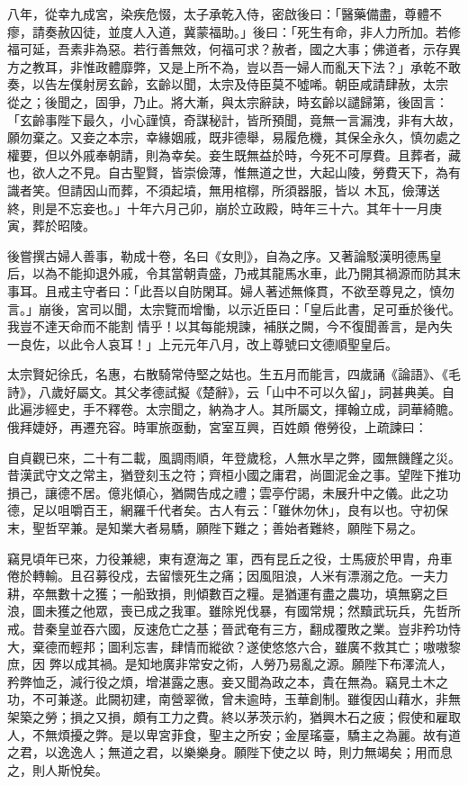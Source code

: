 \begin{pinyinscope}
 八年，從幸九成宮，染疾危惙，太子承乾入侍，密啟後曰：「醫藥備盡，尊體不瘳，請奏赦囚徒，並度人入道，冀蒙福助。」後曰：「死生有命，非人力所加。若修福可延，吾素非為惡。若行善無效，何福可求？赦者，國之大事；佛道者，示存異方之教耳，非惟政體靡弊，又是上所不為，豈以吾一婦人而亂天下法？」承乾不敢奏，以告左僕射房玄齡，玄齡以聞，太宗及侍臣莫不噓唏。朝臣咸請肆赦，太宗
 從之；後聞之，固爭，乃止。將大漸，與太宗辭訣，時玄齡以譴歸第，後固言：「玄齡事陛下最久，小心謹慎，奇謀秘計，皆所預聞，竟無一言漏洩，非有大故，願勿棄之。又妾之本宗，幸緣姻戚，既非德舉，易履危機，其保全永久，慎勿處之權要，但以外戚奉朝請，則為幸矣。妾生既無益於時，今死不可厚費。且葬者，藏也，欲人之不見。自古聖賢，皆崇儉薄，惟無道之世，大起山陵，勞費天下，為有識者笑。但請因山而葬，不須起墳，無用棺槨，所須器服，皆以
 木瓦，儉薄送終，則是不忘妾也。」十年六月己卯，崩於立政殿，時年三十六。其年十一月庚寅，葬於昭陵。



 後嘗撰古婦人善事，勒成十卷，名曰《女則》，自為之序。又著論駁漢明德馬皇后，以為不能抑退外戚，令其當朝貴盛，乃戒其龍馬水車，此乃開其禍源而防其末事耳。且戒主守者曰：「此吾以自防閑耳。婦人著述無條貫，不欲至尊見之，慎勿言。」崩後，宮司以聞，太宗覽而增慟，以示近臣曰：「皇后此書，足可垂於後代。我豈不達天命而不能割
 情乎！以其每能規諫，補朕之闕，今不復聞善言，是內失一良佐，以此令人哀耳！」上元元年八月，改上尊號曰文德順聖皇后。



 太宗賢妃徐氏，名惠，右散騎常侍堅之姑也。生五月而能言，四歲誦《論語》、《毛詩》，八歲好屬文。其父孝德試擬《楚辭》，云「山中不可以久留」，詞甚典美。自此遍涉經史，手不釋卷。太宗聞之，納為才人。其所屬文，揮翰立成，詞華綺贍。俄拜婕妤，再遷充容。時軍旅亟動，宮室互興，百姓頗
 倦勞役，上疏諫曰：



 自貞觀已來，二十有二載，風調雨順，年登歲稔，人無水旱之弊，國無饑饉之災。昔漢武守文之常主，猶登刻玉之符；齊桓小國之庸君，尚圖泥金之事。望陛下推功損己，讓德不居。億兆傾心，猶闕告成之禮；雲亭佇謁，未展升中之儀。此之功德，足以咀嚼百王，網羅千代者矣。古人有云：「雖休勿休」，良有以也。守初保末，聖哲罕兼。是知業大者易驕，願陛下難之；善始者難終，願陛下易之。



 竊見頃年已來，力役兼總，東有遼海之
 軍，西有昆丘之役，士馬疲於甲胄，舟車倦於轉輸。且召募役戍，去留懷死生之痛；因風阻浪，人米有漂溺之危。一夫力耕，卒無數十之獲；一船致損，則傾數百之糧。是猶運有盡之農功，填無窮之巨浪，圖未獲之他眾，喪已成之我軍。雖除兇伐暴，有國常規；然黷武玩兵，先哲所戒。昔秦皇並吞六國，反速危亡之基；晉武奄有三方，翻成覆敗之業。豈非矜功恃大，棄德而輕邦；圖利忘害，肆情而縱欲？遂使悠悠六合，雖廣不救其亡；嗷嗷黎庶，因
 弊以成其禍。是知地廣非常安之術，人勞乃易亂之源。願陛下布澤流人，矜弊恤乏，減行役之煩，增湛露之惠。妾又聞為政之本，貴在無為。竊見土木之功，不可兼遂。此闕初建，南營翠微，曾未逾時，玉華創制。雖復因山藉水，非無架築之勞；損之又損，頗有工力之費。終以茅茨示約，猶興木石之疲；假使和雇取人，不無煩擾之弊。是以卑宮菲食，聖主之所安；金屋瑤臺，驕主之為麗。故有道之君，以逸逸人；無道之君，以樂樂身。願陛下使之以
 時，則力無竭矣；用而息之，則人斯悅矣。




\end{pinyinscope}
